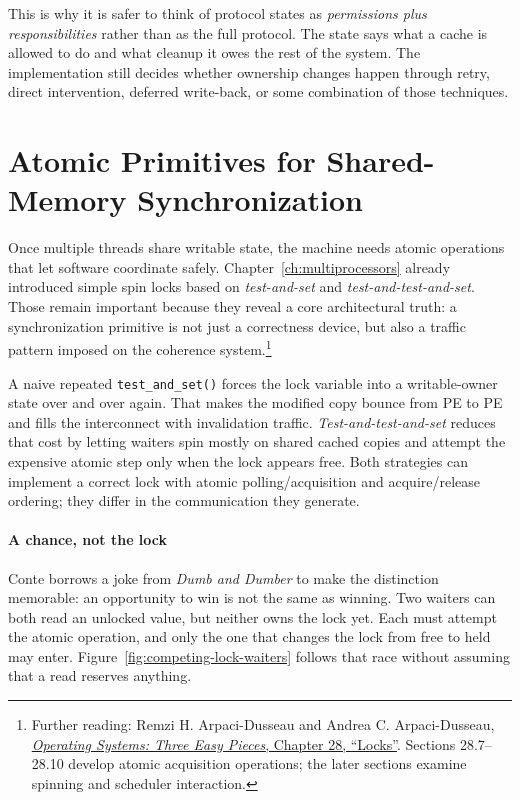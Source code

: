 This is why it is safer to think of protocol states as \emph{permissions plus responsibilities} rather than as the full protocol.
The state says what a cache is allowed to do and what cleanup it owes the rest of the system.
The implementation still decides whether ownership changes happen through retry, direct intervention, deferred write-back, or some combination of those techniques.


\section{Atomic Primitives for Shared-Memory Synchronization}\label{sec:sync-atomic-primitives}
Once multiple threads share writable state, the machine needs atomic operations that let software coordinate safely.
Chapter~\ref{ch:multiprocessors} already introduced simple spin locks based on \textit{test-and-set} and \textit{test-and-test-and-set}.
Those remain important because they reveal a core architectural truth: a synchronization primitive is not just a correctness device, but also a traffic pattern imposed on the coherence system.\footnote{Further reading: Remzi H. Arpaci-Dusseau and Andrea C. Arpaci-Dusseau, \href{https://pages.cs.wisc.edu/~remzi/OSTEP/threads-locks.pdf}{\emph{Operating Systems: Three Easy Pieces}, Chapter 28, ``Locks''}. Sections 28.7--28.10 develop atomic acquisition operations; the later sections examine spinning and scheduler interaction.}

A naive repeated \texttt{test\_and\_set()} forces the lock variable into a writable-owner state over and over again.
That makes the modified copy bounce from PE to PE and fills the interconnect with invalidation traffic.
\textit{Test-and-test-and-set} reduces that cost by letting waiters spin mostly on shared cached copies and attempt the expensive atomic step only when the lock appears free.
Both strategies can implement a correct lock with atomic polling/acquisition and acquire/release ordering; they differ in the communication they generate.

\paragraph{A chance, not the lock}
Conte borrows a joke from \emph{Dumb and Dumber} to make the distinction memorable: an opportunity to win is not the same as winning.
Two waiters can both read an unlocked value, but neither owns the lock yet.
Each must attempt the atomic operation, and only the one that changes the lock from free to held may enter.
Figure~\ref{fig:competing-lock-waiters} follows that race without assuming that a read reserves anything.

